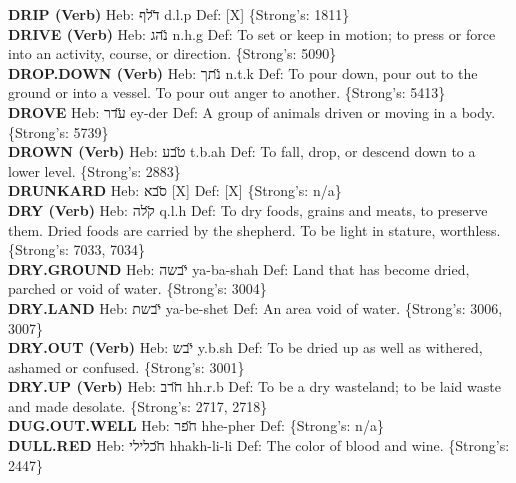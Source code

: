 {\textbf{DRIP (Verb)} Heb: {\large\H דלף} d.l.p Def: {[}X{]} \{Strong's: 1811\}\hfill{}\\

\textbf{DRIVE (Verb)} Heb: {\large\H נהג} n.h.g Def: To set or keep in motion; to press or force into an activity, course, or direction. \{Strong's: 5090\}\hfill{}\\

\textbf{DROP.DOWN (Verb)} Heb: {\large\H נתך} n.t.k Def: To pour down, pour out to the ground or into a vessel. To pour out anger to another. \{Strong's: 5413\}\hfill{}\\

\textbf{DROVE} Heb: {\large\H עדר} ey-der Def: A group of animals driven or moving in a body. \{Strong's: 5739\}\hfill{}\\

\textbf{DROWN (Verb)} Heb: {\large\H טבע} t.b.ah Def: To fall, drop, or descend down to a lower level. \{Strong's: 2883\}\hfill{}\\

\textbf{DRUNKARD} Heb: {\large\H סבא} {[}X{]} Def: {[}X{]} \{Strong's: n/a\}\hfill{}\\

\textbf{DRY (Verb)} Heb: {\large\H קלה} q.l.h Def: To dry foods, grains and meats, to preserve them. Dried foods are carried by the shepherd. To be light in stature, worthless. \{Strong's: 7033, 7034\}\hfill{}\\

\textbf{DRY.GROUND} Heb: {\large\H יבשה} ya-ba-shah Def: Land that has become dried, parched or void of water. \{Strong's: 3004\}\hfill{}\\

\textbf{DRY.LAND} Heb: {\large\H יבשת} ya-be-shet Def: An area void of water. \{Strong's: 3006, 3007\}\hfill{}\\

\textbf{DRY.OUT (Verb)} Heb: {\large\H יבש} y.b.sh Def: To be dried up as well as withered, ashamed or confused. \{Strong's: 3001\}\hfill{}\\

\textbf{DRY.UP (Verb)} Heb: {\large\H חרב} hh.r.b Def: To be a dry wasteland; to be laid waste and made desolate. \{Strong's: 2717, 2718\}\hfill{}\\

\textbf{DUG.OUT.WELL} Heb: {\large\H חפר} hhe-pher Def: \{Strong's: n/a\}\hfill{}\\

\textbf{DULL.RED} Heb: {\large\H חכלילי} hhakh-li-li Def: The color of blood and wine. \{Strong's: 2447\}\hfill{}\\

}
